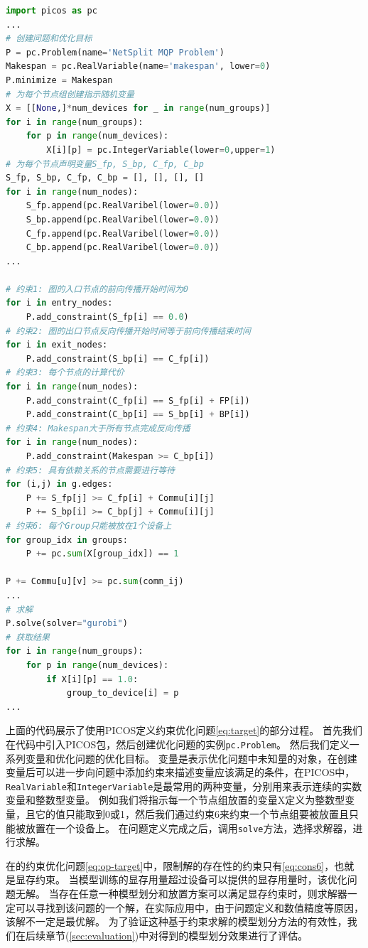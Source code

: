 \begin{lstlisting}[language=Python, caption={约束优化求解的Python实现}]
import picos as pc
...
# 创建问题和优化目标
P = pc.Problem(name='NetSplit MQP Problem')
Makespan = pc.RealVariable(name='makespan', lower=0)
P.minimize = Makespan
# 为每个节点组创建指示随机变量
X = [[None,]*num_devices for _ in range(num_groups)]
for i in range(num_groups):
	for p in range(num_devices):
		X[i][p] = pc.IntegerVariable(lower=0,upper=1)
# 为每个节点声明变量S_fp, S_bp, C_fp, C_bp
S_fp, S_bp, C_fp, C_bp = [], [], [], []
for i in range(num_nodes):
	S_fp.append(pc.RealVaribel(lower=0.0))
	S_bp.append(pc.RealVaribel(lower=0.0))
	C_fp.append(pc.RealVaribel(lower=0.0))
	C_bp.append(pc.RealVaribel(lower=0.0))
...

# 约束1: 图的入口节点的前向传播开始时间为0
for i in entry_nodes:
	P.add_constraint(S_fp[i] == 0.0)
# 约束2: 图的出口节点反向传播开始时间等于前向传播结束时间
for i in exit_nodes:
	P.add_constraint(S_bp[i] == C_fp[i])
# 约束3: 每个节点的计算代价
for i in range(num_nodes):
	P.add_constraint(C_fp[i] == S_fp[i] + FP[i])
	P.add_constraint(C_bp[i] == S_bp[i] + BP[i])
# 约束4: Makespan大于所有节点完成反向传播
for i in range(num_nodes):
	P.add_constraint(Makespan >= C_bp[i])
# 约束5: 具有依赖关系的节点需要进行等待
for (i,j) in g.edges:
    P += S_fp[j] >= C_fp[i] + Commu[i][j]
    P += S_bp[i] >= C_bp[j] + Commu[i][j]
# 约束6: 每个Group只能被放在1个设备上
for group_idx in groups:
    P += pc.sum(X[group_idx]) == 1

P += Commu[u][v] >= pc.sum(comm_ij) 
... 
# 求解
P.solve(solver="gurobi")
# 获取结果
for i in range(num_groups):
	for p in range(num_devices):
		if X[i][p] == 1.0:
			group_to_device[i] = p
...
\end{lstlisting}

上面的代码展示了使用PICOS定义约束优化问题\ref{eq:target}的部分过程。
首先我们在代码中引入PICOS包，然后创建优化问题的实例\texttt{pc.Problem}。
然后我们定义一系列变量和优化问题的优化目标。
变量是表示优化问题中未知量的对象，在创建变量后可以进一步向问题中添加约束来描述变量应该满足的条件，在PICOS中，\texttt{RealVariable}和\texttt{IntegerVariable}是最常用的两种变量，分别用来表示连续的实数变量和整数型变量。
例如我们将指示每一个节点组放置的变量X定义为整数型变量，且它的值只能取到0或1，然后我们通过约束6来约束一个节点组要被放置且只能被放置在一个设备上。
在问题定义完成之后，调用\texttt{solve}方法，选择求解器，进行求解。

在\sys{}的约束优化问题\ref{eq:op-target}中，限制解的存在性的约束只有\ref{eq:cons6}，也就是显存约束。
当模型训练的显存用量超过设备可以提供的显存用量时，该优化问题无解。
当存在任意一种模型划分和放置方案可以满足显存约束时，则求解器一定可以寻找到该问题的一个解，在实际应用中，由于问题定义和数值精度等原因，该解不一定是最优解。
为了验证这种基于约束求解的模型划分方法的有效性，我们在后续章节(\ref{sec:evaluation})中对\sys{}得到的模型划分效果进行了评估。

